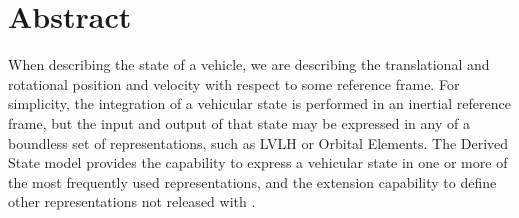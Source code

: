 %
%
% 
%


\section*{Abstract}

When describing the state of a vehicle, we are describing the translational and rotational position and
velocity with respect to some reference frame.  For simplicity, the integration
of a vehicular state is performed in an inertial reference frame, but the input
and output of that state may be expressed in any of a boundless set of
representations, such as LVLH or Orbital Elements.  The Derived State model provides the capability to express a
vehicular state in one or more of the most frequently used representations, and
the extension capability to define other representations not released with
\JEODid.

